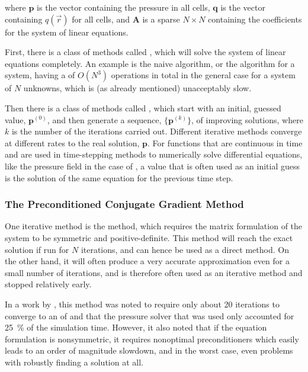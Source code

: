 where $\mathbf{p}$ is the vector containing the pressure in all cells, $\mathbf{q}$ is the vector containing $q(\vec{r})$ for all cells, and $\mathbf{A}$ is a sparse $N\times N$  containing the coefficients for the system of linear equations.

First, there is a class of methods called , which will solve the system of linear equations completely. An example is the naive  algorithm, or the  algorithm for a  system, having a  of $O(N^3)$ operations in total in the general case for a system of $N$ unknowns, which is (as already mentioned) unacceptably slow.

Then there is a class of methods called , which start with an initial, guessed value, $\mathbf{p}^{(0)}$, and then generate a sequence, $\{\mathbf{p}^{(k)}\}$, of improving \approximate solutions, where $k$ is the number of the iterations carried out. Different iterative methods converge at different rates to the real solution, $\mathbf{p}$. For functions that are continuous in time and are used in time-stepping methods to numerically solve differential equations, like the pressure field in the case of \CFD, a value that is often used as an initial guess is the solution of the same equation for the previous time step.

\subsubsection{The Preconditioned Conjugate Gradient Method}


One iterative method is the \PCG method, which requires the matrix formulation of the system to be symmetric and positive-definite. This method will reach the exact solution if run for $N$ iterations, and can hence be used as a direct method. On the other hand, it will often produce a very accurate approximation even for a small number of iterations, and is therefore often used as an iterative method and stopped relatively early.

In a work by \citet{Losasso2004}, this method was noted to require only about 20 iterations to converge to an \accuracy of  and that the pressure solver that was used only accounted for \mbox{25 \%} of the simulation time. However, it also noted that if the equation formulation is nonsymmetric, it requires nonoptimal preconditioners which easily leads to an order of magnitude slowdown, and in the worst case, even problems with robustly finding a solution at all.

